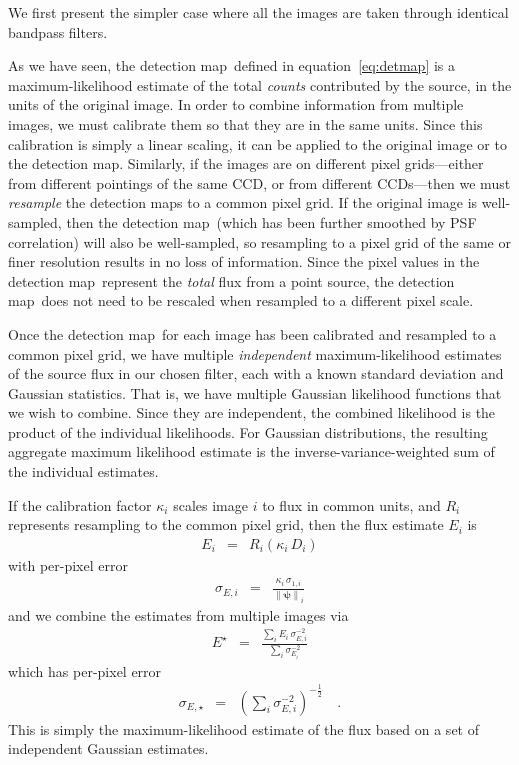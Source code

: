 \documentclass[letterpaper,preprint]{aastex62}
\newcommand{\equationname}{equation}
\newcommand{\eqnref}[1]{\mbox{\equationname~\ref{#1}}}
\newcommand{\detmap}{detection map}
\newcommand{\psf}{\psi}
\newcommand{\psfnorm}{\norm{\bm{\psf}}}
\newcommand{\norm}[1]{\left\lVert #1 \right\rVert}
\begin{document}
We first present the simpler case where all the images are taken
through identical bandpass filters.

As we have seen, the \detmap\ defined in \eqnref{eq:detmap} is a
maximum-likelihood estimate of the total \emph{counts} contributed by
the source, in the units of the original image.  In order to
combine information from multiple images, we must calibrate them so
that they are in the same units.  Since this calibration is simply a
linear scaling, it can be applied to the original image or to the
\detmap.  Similarly, if the images are on different pixel
grids---either from different pointings of the same CCD, or from
different CCDs---then we must \emph{resample} the \detmap s to a
common pixel grid.
%
If the original image is well-sampled, then the \detmap\ (which has
been further smoothed by PSF correlation) will also be well-sampled,
so resampling to a pixel grid of the same or finer resolution results
in no loss of information.
%
Since the pixel values in the \detmap\ represent the \emph{total} flux
from a point source, the \detmap\ does not need to be rescaled when
resampled to a different pixel scale.



Once the \detmap\ for each image has been calibrated and resampled to
a common pixel grid, we have multiple \emph{independent}
maximum-likelihood estimates of the source flux in our chosen filter,
each with a known standard deviation and Gaussian statistics.  That
is, we have multiple Gaussian likelihood functions that we wish to
combine.  Since they are independent, the combined likelihood is the
product of the individual likelihoods.  For Gaussian distributions,
the resulting aggregate maximum likelihood estimate is the
inverse-variance-weighted sum of the individual estimates.

If the calibration factor $\kappa_i$ scales image $i$ to flux in
common units, and $R_i$ represents resampling to the common pixel grid,
then the flux estimate $E_i$ is
\begin{eqnarray}
E_i &=& R_i(\kappa_i \, D_i)
\end{eqnarray}
with per-pixel error
\begin{eqnarray}
\sigma_{E, i} &=& \frac{\kappa_i \, \sigma_{1,i}}{\psfnorm_i}
\end{eqnarray}
and we combine the estimates from multiple images via
\begin{eqnarray}
E^{\star} &=& \frac{\displaystyle\sum_i E_i \, \sigma^{-2}_{E,i}}{\displaystyle\sum_i \sigma^{-2}_{E_i}}
\label{eq:onebandmap}
\end{eqnarray}
which has per-pixel error
\begin{eqnarray}
\sigma_{E, \star} &=& \left( \sum_i \sigma^{-2}_{E,i} \right)^{-\frac{1}{2}}    \quad .
\end{eqnarray}
This is simply the maximum-likelihood estimate of the flux based on a
set of independent Gaussian estimates.
\end{document}
